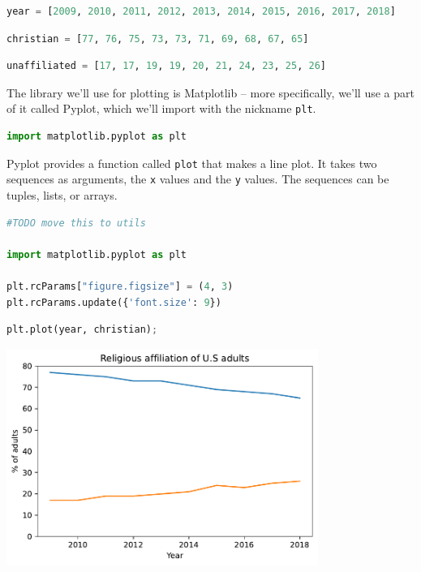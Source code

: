 \begin{lstlisting}[language=Python,style=source]
year = [2009, 2010, 2011, 2012, 2013, 2014, 2015, 2016, 2017, 2018]
\end{lstlisting}

\begin{lstlisting}[language=Python,style=source]
christian = [77, 76, 75, 73, 73, 71, 69, 68, 67, 65]
\end{lstlisting}

\begin{lstlisting}[language=Python,style=source]
unaffiliated = [17, 17, 19, 19, 20, 21, 24, 23, 25, 26]
\end{lstlisting}

The library we'll use for plotting is Matplotlib -- more specifically,
we'll use a part of it called Pyplot, which we'll import with the
nickname \passthrough{\lstinline!plt!}.

\begin{lstlisting}[language=Python,style=source]
import matplotlib.pyplot as plt
\end{lstlisting}

Pyplot provides a function called \passthrough{\lstinline!plot!} that
makes a line plot. It takes two sequences as arguments, the
\passthrough{\lstinline!x!} values and the \passthrough{\lstinline!y!}
values. The sequences can be tuples, lists, or arrays.

\begin{lstlisting}[language=Python,style=source]
#TODO move this to utils

import matplotlib.pyplot as plt

plt.rcParams["figure.figsize"] = (4, 3)  
plt.rcParams.update({'font.size': 9})
\end{lstlisting}

\begin{lstlisting}[language=Python,style=source]
plt.plot(year, christian);
\end{lstlisting}

\begin{center}
\includegraphics[width=4in]{chapters/06_plotting_files/06_plotting_29_0.pdf}
\end{center}

